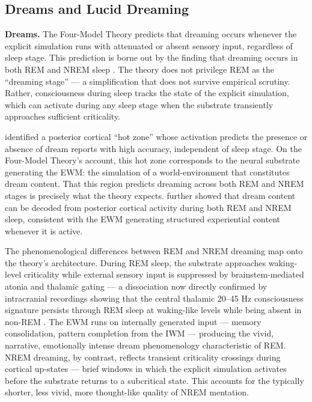 \documentclass[12pt]{article}
\newcommand{\revstart}{}
\begin{document}
{\revstart\subsection{Dreams and Lucid Dreaming}


\textbf{Dreams.} The Four-Model Theory predicts that dreaming occurs whenever the explicit simulation runs with attenuated or absent sensory input, regardless of sleep stage. This prediction is borne out by the finding that dreaming occurs in both REM and NREM sleep \citep{Noreika2009,Siclari2017,Siclari2021,NirTononi2010}. The theory does not privilege REM as the ``dreaming stage'' --- a simplification that does not survive empirical scrutiny. Rather, consciousness during sleep tracks the state of the explicit simulation, which can activate during any sleep stage when the substrate transiently approaches sufficient criticality.

\citet{Siclari2017} identified a posterior cortical ``hot zone'' whose activation predicts the presence or absence of dream reports with high accuracy, independent of sleep stage. On the Four-Model Theory's account, this hot zone corresponds to the neural substrate generating the EWM: the simulation of a world-environment that constitutes dream content. That this region predicts dreaming across both REM and NREM stages is precisely what the theory expects. \citet{Siclari2021} further showed that dream content can be decoded from posterior cortical activity during both REM and NREM sleep, consistent with the EWM generating structured experiential content whenever it is active.

The phenomenological differences between REM and NREM dreaming map onto the theory's architecture. During REM sleep, the substrate approaches waking-level criticality while external sensory input is suppressed by brainstem-mediated atonia and thalamic gating --- a dissociation now directly confirmed by intracranial recordings showing that the central thalamic 20--45 Hz consciousness signature persists through REM sleep at waking-like levels while being absent in non-REM \citep{Chowdhury2026}. The EWM runs on internally generated input --- memory consolidation, pattern completion from the IWM --- producing the vivid, narrative, emotionally intense dream phenomenology characteristic of REM. NREM dreaming, by contrast, reflects transient criticality crossings during cortical up-states \citep{Steriade2001} --- brief windows in which the explicit simulation activates before the substrate returns to a subcritical state. This accounts for the typically shorter, less vivid, more thought-like quality of NREM mentation.

}
\end{document}

